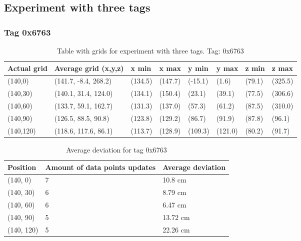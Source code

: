 \subsection{Experiment with three tags}
\subsubsection{Tag 0x6763}
\begin{table}[H]
    \begin{tabular}{|l|l|l|l|l|l|l|l|}
        \hline
        Actual grid & Average grid (x,y,z) & x min   & x max   & y min   & y max   & z min  & z max   \\ \hline
        (140,0)     & (141.7, -8.4, 268.2) & (134.5) & (147.7) & (-15.1) & (1.6)   & (79.1) & (325.5) \\ \hline
        (140,30)    & (140.1, 31.4, 124.0) & (134.1) & (150.4) & (23.1)  & (39.1)  & (77.5) & (306.6) \\ \hline
        (140,60)    & (133.7, 59.1, 162.7) & (131.3) & (137.0) & (57.3)  & (61.2)  & (87.5) & (310.0) \\ \hline
        (140,90)    & (126.5, 88.5, 90.8)  & (123.8) & (129.2) & (86.7)  & (91.9)  & (87.8) & (96.1)  \\ \hline
        (140,120)   & (118.6, 117.6, 86.1) & (113.7) & (128.9) & (109.3) & (121.0) & (80.2) & (91.7)  \\ \hline
    \end{tabular}
    \label{Tab:three-tag-experiment-result-tag-0x6763}
    \caption{Table with grids for experiment with three tags. Tag: 0x6763}
\end{table}

\begin{table}[H]
    \centering
    \begin{tabular}{|l|l|l|}
        \hline
        Position   & Amount of data points updates & Average deviation \\ \hline
        (140, 0)   & 7                             & 10.8 cm           \\ \hline
        (140, 30)  & 6                             & 8.79 cm           \\ \hline
        (140, 60)  & 6                             & 6.47 cm           \\ \hline
        (140, 90)  & 5                             & 13.72 cm          \\ \hline
        (140, 120) & 5                             & 22.26 cm          \\ \hline
    \end{tabular}
    \caption{Average deviation for tag 0x6763}
\end{table}

